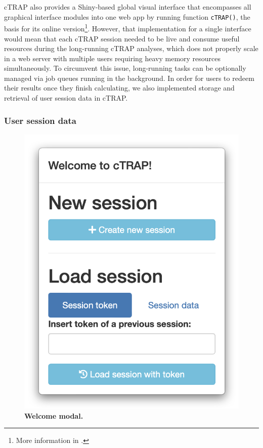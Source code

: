 cTRAP also provides a Shiny-based global visual interface that encompasses all graphical interface modules into one web app by running function \texttt{cTRAP()}, the basis for its online version\footnote{More information in .}. However, that implementation for a single interface would mean that each cTRAP session needed to be live and consume useful resources during the long-running cTRAP analyses, which does not properly scale in a web server with multiple users requiring heavy memory resources simultaneously. To circumvent this issue, long-running tasks can be optionally managed via job queues running in the background. In order for users to redeem their results once they finish calculating, we also implemented storage and retrieval of user session data in cTRAP.

\subsubsection{User session data}
\label{sec:ctrap-web}

\begin{figure}
  \vspace{-2\intextsep}
  \includegraphics[width=\linewidth]{images/ctrap/welcome}
  \caption[Welcome screen modal]{\textbf{Welcome modal.}}
  \vspace{-1\intextsep}
  \label{fig:ctrap-welcome}
\end{figure}


